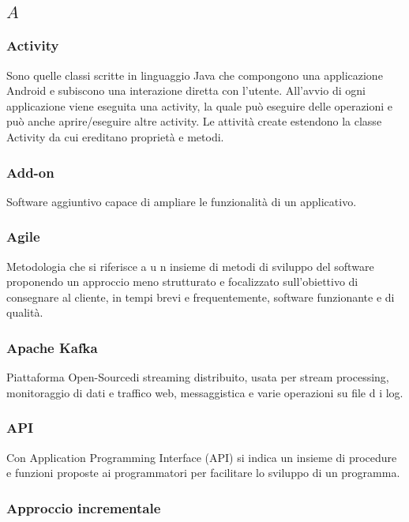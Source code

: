 \subsection*{\quad$A\quad$}
\subsubsection*{Activity}
Sono quelle classi scritte in linguaggio Java che compongono una applicazione Android e subiscono una interazione diretta con l'utente. All'avvio di ogni applicazione viene eseguita una activity, la quale può eseguire delle operazioni e può anche aprire/eseguire altre activity. Le attività create estendono la classe Activity da cui ereditano proprietà e metodi.

\subsubsection*{Add-on}
Software aggiuntivo capace di ampliare le funzionalità di un applicativo.

\subsubsection*{Agile}
Metodologia che si riferisce a u n insieme di metodi di sviluppo del software proponendo un approccio meno strutturato e focalizzato sull'obiettivo di consegnare al cliente, in tempi brevi e frequentemente, software funzionante e di qualità.

\subsubsection*{Apache Kafka}
Piattaforma Open-Source\glosp di streaming distribuito, usata per stream processing, monitoraggio di dati e traffico web, messaggistica e varie operazioni su file d i log.

\subsubsection*{API}
Con Application Programming Interface (API) si indica un insieme di procedure e funzioni proposte ai programmatori per facilitare lo sviluppo di un programma.

\subsubsection*{Approccio incrementale}

